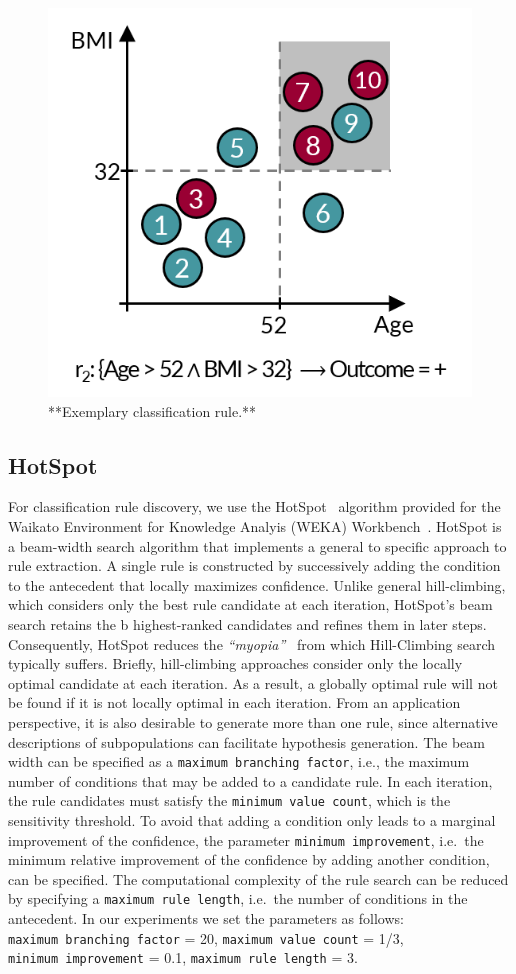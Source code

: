 \documentclass[
  oneside]{book}
\begin{document}
\begin{figure}[htbp]

{\centering \includegraphics[width=0.5\linewidth]{figures/03-rule-intro} 

}

\caption{**Exemplary classification rule.**}\label{fig:03-rule-intro}
\end{figure}

\hypertarget{imm-workflow-hotspot}{%
\subsection{HotSpot}\label{imm-workflow-hotspot}}

For classification rule discovery, we use the HotSpot~\autocite{hotspot2012} algorithm provided for the Waikato Environment for Knowledge Analyis (WEKA) Workbench~\autocite{FrankEtAl:Weka2016}.
HotSpot is a beam-width search algorithm that implements a general to specific approach to rule extraction.
A single rule is constructed by successively adding the condition to the antecedent that locally maximizes confidence.
Unlike general hill-climbing, which considers only the best rule candidate at each iteration, HotSpot's beam search retains the b highest-ranked candidates and refines them in later steps.
Consequently, HotSpot reduces the \emph{``myopia''}~\autocite{Fuernkranz:12} from which Hill-Climbing search typically suffers.
Briefly, hill-climbing approaches consider only the locally optimal candidate at each iteration.
As a result, a globally optimal rule will not be found if it is not locally optimal in each iteration.
From an application perspective, it is also desirable to generate more than one rule, since alternative descriptions of subpopulations can facilitate hypothesis generation.
The beam width can be specified as a \texttt{maximum\ branching\ factor}, i.e., the maximum number of conditions that may be added to a candidate rule.
In each iteration, the rule candidates must satisfy the \texttt{minimum\ value\ count}, which is the sensitivity threshold.
To avoid that adding a condition only leads to a marginal improvement of the confidence, the parameter \texttt{minimum\ improvement}, i.e.~the minimum relative improvement of the confidence by adding another condition, can be specified.
The computational complexity of the rule search can be reduced by specifying a \texttt{maximum\ rule\ length}, i.e.~the number of conditions in the antecedent.
In our experiments we set the parameters as follows: \texttt{maximum\ branching\ factor} = 20, \texttt{maximum\ value\ count} = 1/3, \texttt{minimum\ improvement} = 0.1, \texttt{maximum\ rule\ length} = 3.
\end{document}
